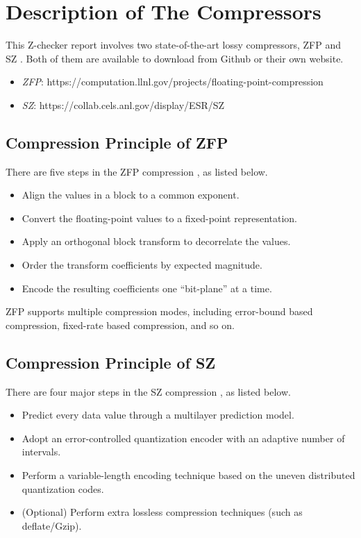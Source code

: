 \section{Description of The Compressors}

This Z-checker \cite{z-checker} report involves two state-of-the-art lossy compressors, ZFP \cite{lindstrom} and SZ \cite{di,tao}.
Both of them are available to download from Github or their own website. 
\begin{itemize}
\item \emph{ZFP}: https://computation.llnl.gov/projects/floating-point-compression
\item \emph{SZ}: https://collab.cels.anl.gov/display/ESR/SZ
\end{itemize}

\subsection{Compression Principle of ZFP}

There are five steps in the ZFP compression \cite{lindstrom}, as listed below.
\begin{itemize}
\item Align the values in a block to a common exponent. 
\item Convert the floating-point values to a fixed-point representation.
\item Apply an orthogonal block transform to decorrelate the values.
\item Order the transform coefficients by expected magnitude.
\item Encode the resulting coefficients one ``bit-plane'' at a time.
\end{itemize}

ZFP supports multiple compression modes, including error-bound based compression, fixed-rate based compression, and so on. 

\subsection{Compression Principle of SZ}

There are four major steps in the SZ compression \cite{di,tao}, as listed below.
\begin{itemize}
\item Predict every data value through a multilayer prediction model.
\item Adopt an error-controlled quantization encoder with an adaptive number of intervals.
\item Perform a variable-length encoding technique based on the uneven distributed quantization codes.
\item (Optional) Perform extra lossless compression techniques (such as deflate/Gzip).
\end{itemize}

